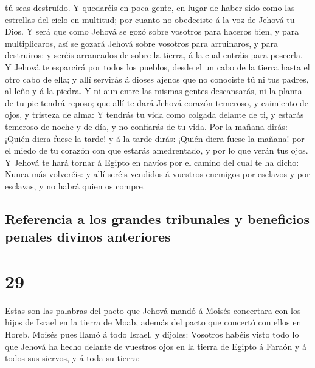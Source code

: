 tú seas destruído.  Y quedaréis en poca gente, en lugar
de haber sido como las estrellas del cielo en multitud; por cuanto no
obedeciste á la voz de Jehová tu Dios.  Y será que como
Jehová se gozó sobre vosotros para haceros bien, y para multiplicaros,
así se gozará Jehová sobre vosotros para arruinaros, y para destruiros;
y seréis arrancados de sobre la tierra, á la cual entráis para poseerla.
 Y Jehová te esparcirá por todos los pueblos, desde el un
cabo de la tierra hasta el otro cabo de ella; y allí servirás á dioses
ajenos que no conociste tú ni tus padres, al leño y á la piedra.
 Y ni aun entre las mismas gentes descansarás, ni la
planta de tu pie tendrá reposo; que allí te dará Jehová corazón
temeroso, y caimiento de ojos, y tristeza de alma:  Y
tendrás tu vida como colgada delante de ti, y estarás temeroso de noche
y de día, y no confiarás de tu vida.  Por la mañana
dirás: ¡Quién diera fuese la tarde! y á la tarde dirás: ¡Quién diera
fuese la mañana! por el miedo de tu corazón con que estarás amedrentado,
y por lo que verán tus ojos.  Y Jehová te hará tornar á
Egipto en navíos por el camino del cual te ha dicho: Nunca más
volveréis: y allí seréis vendidos á vuestros enemigos por esclavos y por
esclavas, y no habrá quien os compre.

\hypertarget{referencia-a-los-grandes-tribunales-y-beneficios-penales-divinos-anteriores}{%
\subsection{Referencia a los grandes tribunales y beneficios penales
divinos
anteriores}\label{referencia-a-los-grandes-tribunales-y-beneficios-penales-divinos-anteriores}}

\hypertarget{section-05-29}{%
\section{29}\label{section-05-29}}

 Estas son las palabras del pacto que Jehová mandó á
Moisés concertara con los hijos de Israel en la tierra de Moab, además
del pacto que concertó con ellos en Horeb.  Moisés pues
llamó á todo Israel, y díjoles: Vosotros habéis visto todo lo que Jehová
ha hecho delante de vuestros ojos en la tierra de Egipto á Faraón y á
todos sus siervos, y á toda su tierra:


